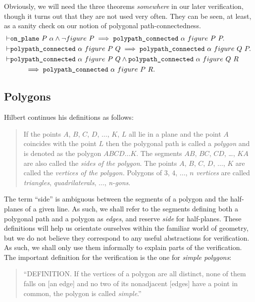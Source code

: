 Obviously, we will need the three theorems \emph{somewhere} in our later verification, though it turns out that they are not used very often. They can be seen, at least, as a sanity check on our notion of polygonal path-connectedness.
\begingroup
\allowdisplaybreaks
\begin{align*}
  \vdash&\texttt{on\_plane}\ P\ \alpha \wedge \neg figure\ P \implies \texttt{polypath\_connected}\ \alpha\ figure\ P\ P.\\
  \vdash&\texttt{polypath\_connected}\ \alpha\ figure\ P\ Q \implies \texttt{polypath\_connected}\ \alpha\ figure\ Q\ P.\\
  \vdash&\texttt{polypath\_connected}\ \alpha\ figure\ P\ Q \wedge \texttt{polypath\_connected}\ \alpha\ figure\ Q\ R\\
  &\qquad\implies \texttt{polypath\_connected}\ \alpha\ figure\ P\ R.
\end{align*}
\endgroup

\subsection{Polygons}\label{sec:polygonFormalisation}
Hilbert continues his definitions as follows:
\begin{quotation}
  If the points $A$, $B$, $C$, $D$, $\ldots$, $K$, $L$ all lie in a plane and the point $A$ coincides with the point $L$ then the polygonal path is called a \emph{polygon} and is denoted as the polygon $ABCD\ldots K$. The segments $AB$, $BC$, $CD$, \ldots, $KA$ are also called the \emph{sides of the polygon}. The points $A$, $B$, $C$, $D$, $\ldots$, $K$ are called the \emph{vertices of the polygon.} Polygons of $3$, $4$, $\ldots$, $n$ \emph{vertices} are called \emph{triangles}, \emph{quadrilaterals}, $\ldots$, \emph{n-gons}.
\end{quotation}

The term ``side'' is ambiguous between the segments of a polygon and the half-planes of a given line. As such, we shall refer to the segments defining both a polygonal path and a polygon as \emph{edges}, and reserve \emph{side} for half-planes. These definitions will help us orientate ourselves within the familiar world of geometry, but we do not believe they correspond to any useful abstractions for verification. As such, we shall only use them informally to explain parts of the verification. The important definition for the verification is the one for \emph{simple polygons}:
\begin{quote}
  ``DEFINITION. If the vertices of a polygon are all distinct, none of them falls on [an edge] and no two of its nonadjacent [edges] have a point in common, the polygon is called \emph{simple}.''
\end{quote}

